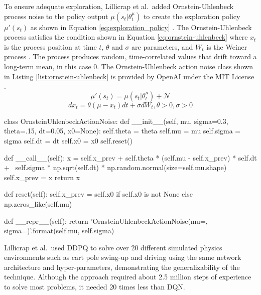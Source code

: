 To ensure adequate exploration, Lillicrap et al.\ added Ornstein-Uhlenbeck process noise to the policy output $\mu(s_t | \theta^\mu_t)$ to create the exploration policy $\mu'(s_t)$ as shown in Equation \ref{eq:exploration_policy} \cite{lillicrap_2016}. The Ornstein-Uhlenbeck process satisfies the condition shown in Equation \ref{eq:ornstein-uhlenbeck} where $x_t$ is the process position at time $t$, $\theta$ and $\sigma$ are parameters, and $W_t$ is the Weiner process \cite{uhlenbeck_ornstein}. The process produces random, time-correlated values that drift toward a long-term mean, in this case 0. The Ornstein-Uhlenbeck action noise class shown in Listing \ref{list:ornstein-uhlenbeck} is provided by OpenAI under the MIT License \cite{ddpg_noise}.
\begin{equation}
\label{eq:exploration_policy}
\mu'(s_t) = \mu(s_t | \theta^\mu_t) + \mathcal{N}
\end{equation}
\begin{equation}
\label{eq:ornstein-uhlenbeck}
dx_t = \theta(\mu-x_t) dt + \sigma dW_t, \theta>0, \sigma>0
\end{equation}
\begin{python}[caption={Ornstein-Uhlenbeck Action Noise \cite{ddpg_noise}},label={list:ornstein-uhlenbeck}]
class OrnsteinUhlenbeckActionNoise:
    def __init__(self, mu, sigma=0.3, theta=.15, dt=0.05, x0=None):
        self.theta = theta
        self.mu = mu
        self.sigma = sigma
        self.dt = dt
        self.x0 = x0
        self.reset()

    def __call__(self):
        x = self.x_prev + self.theta * (self.mu - self.x_prev) * self.dt + \
                self.sigma * np.sqrt(self.dt) * np.random.normal(size=self.mu.shape)
        self.x_prev = x
        return x

    def reset(self):
        self.x_prev = self.x0 if self.x0 is not None else np.zeros_like(self.mu)

    def __repr__(self):
        return 'OrnsteinUhlenbeckActionNoise(mu={}, sigma={})'.format(self.mu, self.sigma)
\end{python}

Lillicrap et al.\ used DDPQ to solve over 20 different simulated physics environments such as cart pole swing-up and driving using the same network architecture and hyper-parameters, demonstrating the generalizability of the technique. Although the approach required about 2.5 million steps of experience to solve most problems, it needed 20 times less than DQN. 

